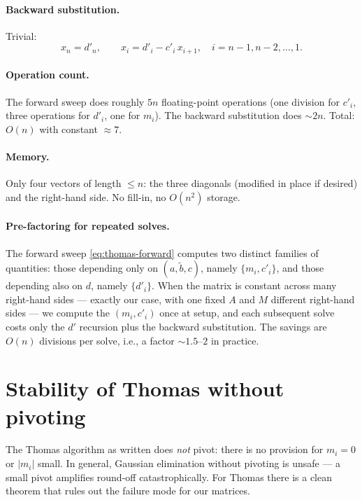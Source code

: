 \documentclass[11pt,a4paper]{article}
\begin{document}
\paragraph{Backward substitution.} Trivial:
\begin{equation}
x_n = d'_n, \qquad
x_i = d'_i - c'_i\,x_{i+1}, \quad i = n-1, n-2, \dots, 1.
\label{eq:thomas-back}
\end{equation}

\paragraph{Operation count.} The forward sweep does roughly $5n$
floating-point operations (one division for $c'_i$, three operations
for $d'_i$, one for $m_i$). The backward substitution does $\sim 2n$.
Total: $O(n)$ with constant $\approx 7$.

\paragraph{Memory.} Only four vectors of length $\le n$: the three
diagonals (modified in place if desired) and the right-hand side.
No fill-in, no $O(n^2)$ storage.

\paragraph{Pre-factoring for repeated solves.} The forward sweep
\eqref{eq:thomas-forward} computes two distinct families of
quantities: those depending only on $(a, \tilde b, c)$, namely
$\{m_i, c'_i\}$, and those depending also on $d$, namely
$\{d'_i\}$. When the matrix is constant across many right-hand
sides — exactly our case, with one fixed $A$ and $M$ different
right-hand sides — we compute the $(m_i, c'_i)$ once at setup, and
each subsequent solve costs only the $d'$ recursion plus the
backward substitution. The savings are $O(n)$ divisions per solve,
i.e., a factor $\sim 1.5$--$2$ in practice.

\section{Stability of Thomas without pivoting}

The Thomas algorithm as written does \emph{not} pivot: there is no
provision for $m_i = 0$ or $|m_i|$ small. In general, Gaussian
elimination without pivoting is unsafe — a small pivot amplifies
round-off catastrophically. For Thomas there is a clean theorem
that rules out the failure mode for our matrices.
\end{document}
